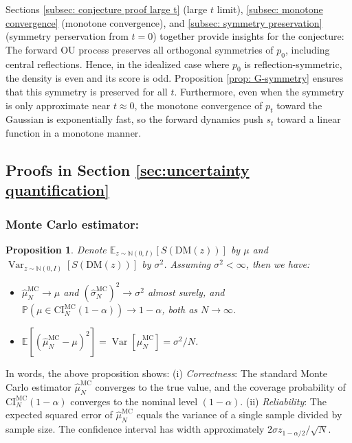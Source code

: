 \documentclass[12pt]{article}
\newcommand{\0}{\mathbf{0}}
\newcommand{\bE}{\mathbb{E}}
\newcommand{\bN}{\mathbb{N}}
\newcommand{\bP}{\mathbb{P}}
\newcommand{\DM}{\text{DM}}
\newcommand{\MC}{\text{MC}}
\newcommand{\CI}{\text{CI}}
\DeclareMathOperator{\Var}{Var}
\newtheorem{prop}{Proposition}
\begin{document}
Sections \ref{subsec: conjecture proof large t} (large $t$ limit), \ref{subsec: monotone convergence} (monotone convergence), and \ref{subsec: symmetry preservation} (symmetry perservation from $t = 0$) together provide insights for the conjecture: The forward OU process preserves all orthogonal symmetries of $p_0$, including central reflections. Hence, in the idealized case where $p_0$ is reflection-symmetric, the density is even and its score is odd. Proposition \ref{prop: G-symmetry} ensures that this symmetry is preserved for all $t$. Furthermore, even when the symmetry is only approximate near $t\approx 0$, the monotone convergence of $p_t$ toward the Gaussian is exponentially fast, so the forward dynamics push $s_t$ toward a linear function in a monotone manner.




\subsection{Proofs in Section \ref{sec:uncertainty quantification}}\label{subsec: proof uq}
\subsubsection{Monte Carlo estimator:}


\begin{prop}\label{prop:MC-guarantee}
    Denote $\bE_{z\sim\bN(0,I)}[S(\DM(z))]$ by $\mu$ and $\Var_{z\sim\bN(0,I)}[S(\DM(z))]$ by $\sigma^2$. Assuming $\sigma^2 < \infty$, then we have:
    \begin{itemize}[leftmargin = *]
        \item $\hat \mu_N^\MC \rightarrow \mu$ and $(\hat\sigma_N^\MC)^2 \rightarrow \sigma^2$ almost surely, and   $\bP\left(\mu \in \CI^\MC_N(1-\alpha)\right) \rightarrow 1-\alpha$, both as $N\rightarrow \infty$.
        \item $\bE[(\hat\mu_N^\MC - \mu)^2] = \Var[\hat\mu_N^\MC] = \sigma^2/N$.
      
    \end{itemize}
\end{prop}

In words, the above proposition shows: (i) \textit{Correctness}: The standard Monte Carlo estimator $\hat \mu_N^\MC$ converges to the true value, and the coverage probability of $\CI^\MC_N(1-\alpha)$ converges to the nominal level $(1-\alpha)$. (ii) \textit{Reliability}: The expected squared error of $\hat \mu_N^\MC$ equals the variance of a single sample divided by sample size. The confidence interval has width approximately $2\sigma z_{1-\alpha/2} / \sqrt{N}$.
\end{document}
